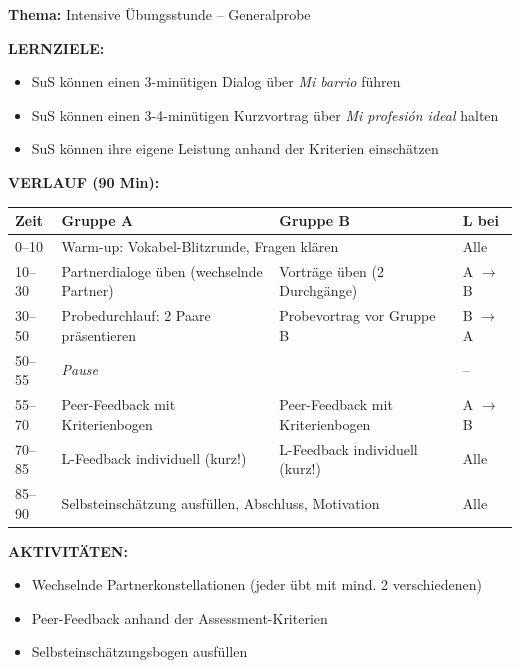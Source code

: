 \documentclass[11pt, a4paper]{article}
\newcommand{\es}[1]{\textcolor{spanisch}{\textit{#1}}}
\begin{document}
\begin{dsbox}[title={DS 4 -- Letzte Bucharbeit vor Assessment (Di, 13.01.2026)}]

\textbf{Thema:} Intensive Übungsstunde -- Generalprobe

\vspace{0.3cm}

\textbf{LERNZIELE:}
\begin{itemize}[leftmargin=1.5em, nosep]
    \item[\textcolor{gruppeA}{A:}] SuS können einen 3-minütigen Dialog über \es{Mi barrio} führen
    \item[\textcolor{gruppeB}{B:}] SuS können einen 3-4-minütigen Kurzvortrag über \es{Mi profesión ideal} halten
    \item[Alle:] SuS können ihre eigene Leistung anhand der Kriterien einschätzen
\end{itemize}

\vspace{0.2cm}

\textbf{VERLAUF (90 Min):}

\begin{tabular}{|p{1.2cm}|p{5.5cm}|p{5.5cm}|p{1.5cm}|}
\hline
\rowcolor{hellgrau}
\textbf{Zeit} & \textbf{Gruppe A} & \textbf{Gruppe B} & \textbf{L bei} \\
\hline
0--10 & \multicolumn{2}{l|}{Warm-up: Vokabel-Blitzrunde, Fragen klären} & Alle \\
\hline
10--30 & Partnerdialoge üben (wechselnde Partner) & Vorträge üben (2 Durchgänge) & A $\rightarrow$ B \\
\hline
30--50 & Probedurchlauf: 2 Paare präsentieren & Probevortrag vor Gruppe B & B $\rightarrow$ A \\
\hline
50--55 & \multicolumn{2}{l|}{\textit{Pause}} & -- \\
\hline
55--70 & Peer-Feedback mit Kriterienbogen & Peer-Feedback mit Kriterienbogen & A $\rightarrow$ B \\
\hline
70--85 & L-Feedback individuell (kurz!) & L-Feedback individuell (kurz!) & Alle \\
\hline
85--90 & \multicolumn{2}{l|}{Selbsteinschätzung ausfüllen, Abschluss, Motivation} & Alle \\
\hline
\end{tabular}

\vspace{0.2cm}

\textbf{AKTIVITÄTEN:}
\begin{itemize}[leftmargin=1.5em, nosep]
    \item Wechselnde Partnerkonstellationen (jeder übt mit mind. 2 verschiedenen)
    \item Peer-Feedback anhand der Assessment-Kriterien
    \item Selbsteinschätzungsbogen ausfüllen
\end{itemize}


\end{dsbox}
\end{document}
